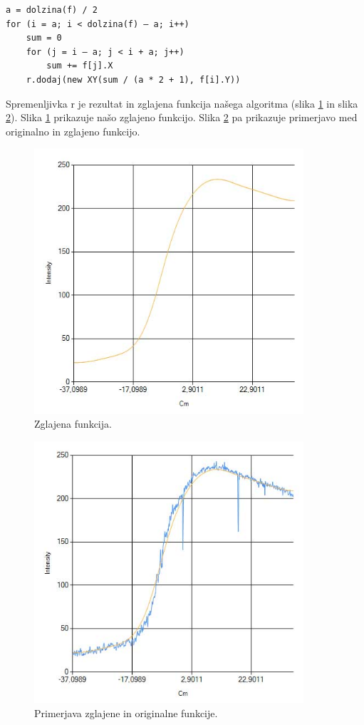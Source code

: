 \documentclass[oneside, a4paper, 12pt]{book}
\begin{document}
\begin{verbatim}
a = dolzina(f) / 2
for (i = a; i < dolzina(f) – a; i++)
    sum = 0
    for (j = i – a; j < i + a; j++)
        sum += f[j].X
    r.dodaj(new XY(sum / (a * 2 + 1), f[i].Y))
\end{verbatim}

Spremenljivka r je rezultat in zglajena funkcija našega algoritma (slika \ref{pic:smooth1} in slika \ref{pic:smooth2}).
Slika \ref{pic:smooth1} prikazuje našo zglajeno funkcijo. Slika \ref{pic:smooth2} pa prikazuje primerjavo med originalno in zglajeno funkcijo.

\begin{figure}
\begin{center}
\includegraphics[width=10cm]{slike/glajena-funkcija.jpg}
\end{center}
\caption{Zglajena funkcija.}
\label{pic:smooth1}
\end{figure}

\begin{figure}
\begin{center}
\includegraphics[width=10cm]{slike/glajena-+-original.jpg}
\end{center}
\caption{Primerjava zglajene in originalne funkcije.}
\label{pic:smooth2}
\end{figure}
\end{document}
